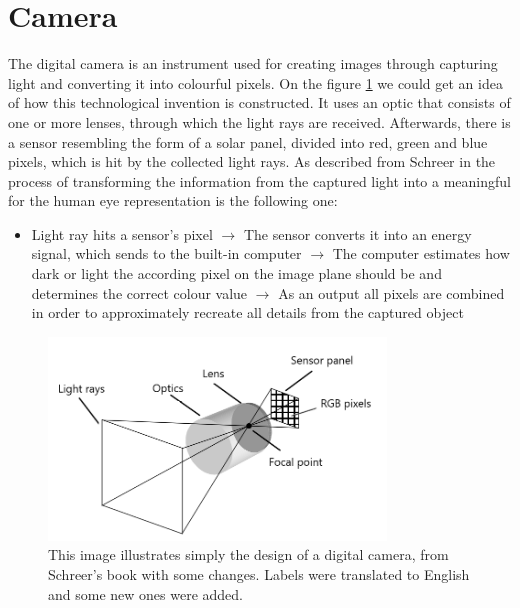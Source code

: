 \section{Camera}\label{camera_section}
The digital camera is an instrument used for creating images through capturing light and converting it into colourful pixels. On the figure \ref{fig:camera_construction} we could get an idea of how this technological invention is constructed. It uses an optic that consists of one or more lenses, through which the light rays are received. Afterwards, there is a sensor resembling the form of a solar panel, divided into red, green and blue pixels, which is hit by the collected light rays. As described from Schreer in \cite{camera_pinhole_model} the process of transforming the information from the captured light into a meaningful for the human eye representation is the following one: 
\begin{itemize}
    \item Light ray hits a sensor's pixel $\rightarrow$ The sensor converts it into an energy signal, which sends to the built-in computer $\rightarrow$ The computer estimates how dark or light the according pixel on the image plane should be and determines the correct colour value $\rightarrow$ As an output all pixels are combined in order to approximately recreate all details from the captured object  
\end{itemize}

\begin{figure}[h]
\centering
\includegraphics[width=0.8\textwidth]{images/camera_construction.png}
\caption[Digital camera's design]{This image illustrates simply the design of a digital camera, from Schreer's book \cite{camera_pinhole_model} with some changes. Labels were translated to English and some new ones were added. \label{fig:camera_construction}}
\end{figure}

